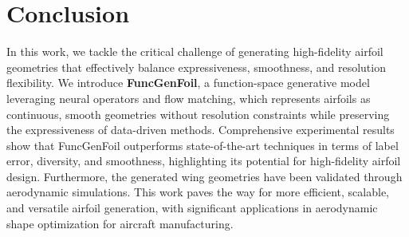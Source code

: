 \section{Conclusion}

In this work, we tackle the critical challenge of generating high-fidelity airfoil geometries that effectively balance expressiveness, smoothness, and resolution flexibility. We introduce \textbf{FuncGenFoil}, a function-space generative model leveraging neural operators and flow matching, which represents airfoils as continuous, smooth geometries without resolution constraints while preserving the expressiveness of data-driven methods. Comprehensive experimental results show that FuncGenFoil outperforms state-of-the-art techniques in terms of label error, diversity, and smoothness, highlighting its potential for high-fidelity airfoil design. Furthermore, the generated wing geometries have been validated through aerodynamic simulations. This work paves the way for more efficient, scalable, and versatile airfoil generation, with significant applications in aerodynamic shape optimization for aircraft manufacturing.



